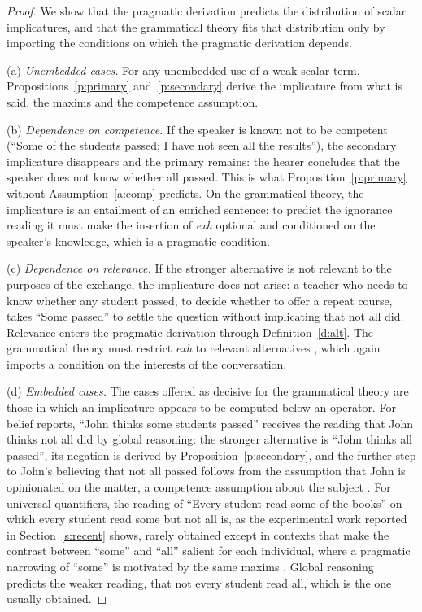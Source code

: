 \documentclass{situationist-preprint}
\begin{document}
\begin{proof}
We show that the pragmatic derivation predicts the distribution of scalar implicatures, and that the grammatical theory fits that distribution only by importing the conditions on which the pragmatic derivation depends.

(a) \emph{Unembedded cases.} For any unembedded use of a weak scalar term, Propositions~\ref{p:primary} and~\ref{p:secondary} derive the implicature from what is said, the maxims and the competence assumption.

(b) \emph{Dependence on competence.} If the speaker is known not to be competent (\enquote{Some of the students passed; I have not seen all the results}), the secondary implicature disappears and the primary remains: the hearer concludes that the speaker does not know whether all passed. This is what Proposition~\ref{p:primary} without Assumption~\ref{a:comp} predicts. On the grammatical theory, the implicature is an entailment of an enriched sentence; to predict the ignorance reading it must make the insertion of \emph{exh} optional and conditioned on the speaker's knowledge, which is a pragmatic condition.

(c) \emph{Dependence on relevance.} If the stronger alternative is not relevant to the purposes of the exchange, the implicature does not arise: a teacher who needs to know whether any student passed, to decide whether to offer a repeat course, takes \enquote{Some passed} to settle the question without implicating that not all did. Relevance enters the pragmatic derivation through Definition~\ref{d:alt}. The grammatical theory must restrict \emph{exh} to relevant alternatives \citep{ChierchiaFoxSpector2012}, which again imports a condition on the interests of the conversation.

(d) \emph{Embedded cases.} The cases offered as decisive for the grammatical theory are those in which an implicature appears to be computed below an operator. For belief reports, \enquote{John thinks some students passed} receives the reading that John thinks not all did by global reasoning: the stronger alternative is \enquote{John thinks all passed}, its negation is derived by Proposition~\ref{p:secondary}, and the further step to John's believing that not all passed follows from the assumption that John is opinionated on the matter, a competence assumption about the subject \citep{Sauerland2004,Russell2006}. For universal quantifiers, the reading of \enquote{Every student read some of the books} on which every student read some but not all is, as the experimental work reported in Section~\ref{s:recent} shows, rarely obtained except in contexts that make the contrast between \enquote{some} and \enquote{all} salient for each individual, where a pragmatic narrowing of \enquote{some} is motivated by the same maxims \citep{GeurtsPouscoulous2009}. Global reasoning predicts the weaker reading, that not every student read all, which is the one usually obtained.


\end{proof}
\end{document}
